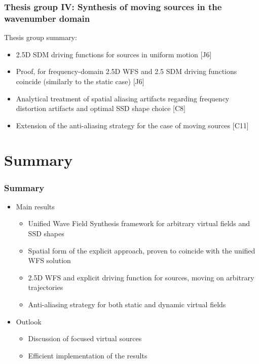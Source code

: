 \documentclass{beamer}
\begin{document}
\begin{frame}
\frametitle{Thesis group IV: Synthesis of moving sources in the wavenumber domain}
Thesis group summary:
	\vspace{3mm}	
	\begin{itemize}
	\item 2.5D SDM driving functions for sources in uniform motion [J6]
	\vspace{3mm}	
	\item Proof, for frequency-domain 2.5D WFS and 2.5 SDM driving functions coincide (similarly to the static case) [J6]
	\vspace{3mm}	
	\item Analytical treatment of spatial aliasing artifacts regarding frequency distortion artifacts and optimal SSD shape choice [C8]
	\vspace{3mm}	
	\item Extension of the anti-aliasing strategy for the case of moving sources [C11]
	\end{itemize}
\end{frame}

\section{Summary}
\begin{frame}
\frametitle{Summary}
\begin{itemize}
\item Main results
	\vspace{3mm}	
	\begin{itemize}
	\item Unified Wave Field Synthesis framework for arbitrary virtual fields and SSD shapes	\vspace{3mm}	
	\item Spatial form of the explicit approach, proven to coincide with the unified WFS solution 	\vspace{3mm}	
	\item 2.5D WFS and explicit driving function for sources, moving on arbitrary trajectories 	\vspace{3mm}	
	\item Anti-aliasing strategy for both static and dynamic virtual fields
	\end{itemize}
	\vspace{3mm}
\item Outlook
	\begin{itemize}
	\item Discussion of focused virtual sources	\vspace{3mm}	
	\item Efficient implementation of the results
	\end{itemize}
\end{itemize}
\end{frame}
\end{document}
